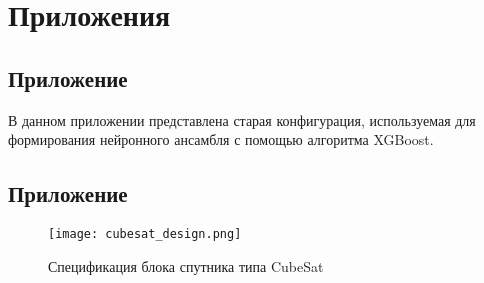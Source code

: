 \renewcommand{\chaptermark}[1]{\markboth{}{}}
\renewcommand{\sectionmark}[1]{\markright{\arabic{section}.\ #1}}

\titleformat{\section}[block]{\large\bfseries\filcenter}{}{0em}{}
\chapter*{Приложения}

\section{Приложение }
\label{subsec:old_polaris_learn_config}

В данном приложении представлена старая конфигурация, используемая для формирования нейронного ансамбля с помощью алгоритма XGBoost.

%

\section{Приложение }
\label{subsec:attachement_cubesat_design}

\begin{sidewaysfigure}[htbp]
	\centering
	\texttt{[image: cubesat\_design.png]}
	\caption{Спецификация блока спутника типа CubeSat}
\end{sidewaysfigure}




